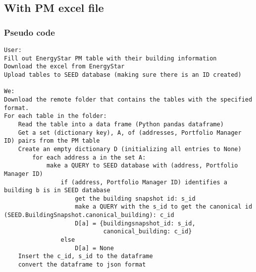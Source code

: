 \documentclass[12pt]{article}
\begin{document}

\subsection{With PM excel file}
\subsubsection{Pseudo code}
\begin{verbatim}
User:
Fill out EnergyStar PM table with their building information
Download the excel from EnergyStar
Upload tables to SEED database (making sure there is an ID created)

We:
Download the remote folder that contains the tables with the specified format.
For each table in the folder:
    Read the table into a data frame (Python pandas dataframe)
    Get a set (dictionary key), A, of (addresses, Portfolio Manager ID) pairs from the PM table
    Create an empty dictionary D (initializing all entries to None)
        for each address a in the set A:
            make a QUERY to SEED database with (address, Portfolio Manager ID) 
                if (address, Portfolio Manager ID) identifies a building b is in SEED database
                    get the building snapshot id: s_id
                    make a QUERY with the s_id to get the canonical id (SEED.BuildingSnapshot.canonical_building): c_id
                    D[a] = {buildingsnapshot_id: s_id,
                            canonical_building: c_id}
                else 
                    D[a] = None
    Insert the c_id, s_id to the dataframe
    convert the dataframe to json format
\end{verbatim}
\pagebreak
\end{document}
